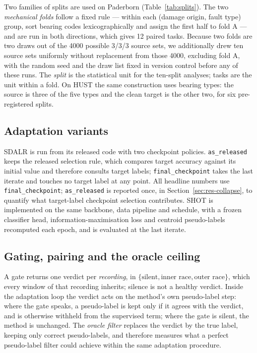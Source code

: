 Two families of splits are used on Paderborn (Table~\ref{tab:splits}). The two \emph{mechanical folds} follow a fixed rule
--- within each (damage origin, fault type) group, sort bearing codes lexicographically and assign the first half to fold A
--- and are run in both directions, which gives 12 paired tasks. Because two folds are two draws out of the 4000 possible
3/3/3 source sets, we additionally drew ten source sets uniformly without replacement from those 4000, excluding fold A,
with the random seed and the draw list fixed in version control before any of these runs. The \emph{split} is the
statistical unit for the ten-split analyses; tasks are the unit within a fold. On HUST the same construction uses bearing
types: the source is three of the five types and the clean target is the other two, for six pre-registered splits.

\subsection{Adaptation variants}

SDALR is run from its released code with two checkpoint policies. \texttt{as\_released} keeps the released selection rule,
which compares target accuracy against its initial value and therefore consults target labels; \texttt{final\_checkpoint}
takes the last iterate and touches no target label at any point. All headline numbers use \texttt{final\_checkpoint};
\texttt{as\_released} is reported once, in Section~\ref{sec:res-collapse}, to quantify what target-label checkpoint
selection contributes. SHOT is implemented on the same backbone, data pipeline and schedule, with a frozen classifier head,
information-maximisation loss and centroid pseudo-labels recomputed each epoch, and is evaluated at the last iterate.

\subsection{Gating, pairing and the oracle ceiling}

A gate returns one verdict per \emph{recording}, in $\{\text{silent},\text{inner race},\text{outer race}\}$, which every
window of that recording inherits; silence is not a healthy verdict. Inside the adaptation loop the verdict acts on the
method's own pseudo-label step: where the gate speaks, a pseudo-label is kept only if it agrees with the verdict, and is
otherwise withheld from the supervised term; where the gate is silent, the method is unchanged. The \emph{oracle filter}
replaces the verdict by the true label, keeping only correct pseudo-labels, and therefore measures what a perfect
pseudo-label filter could achieve within the same adaptation procedure.


